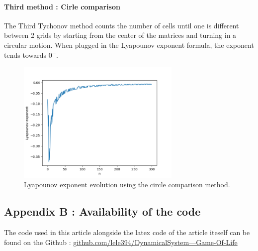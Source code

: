 \documentclass{article}
\begin{document}
\paragraph{Third method : Cirle comparison}
The Third Tychonov method counts the number of cells until one is different between 2 grids by 
starting from the center of the matrices and turning in a circular motion. When plugged
in the Lyapounov exponent formula, the exponent tends towards $0^-$.
\begin{figure}[h!]
    \centering
    \includegraphics[width=0.7\textwidth]{res/lyapounov_3.png}
    \caption{Lyapounov exponent evolution using the circle comparison method.}
    \label{fig:lyapounov_3}
\end{figure}



\subsection*{Appendix B : Availability of the code}
The code used in this article alongside the latex code of the article iteself can be
found on the Github : \href{https://github.com/lele394/DynamicalSystem---Game-Of-Life}{github.com/lele394/DynamicalSystem---Game-Of-Life}
\end{document}
